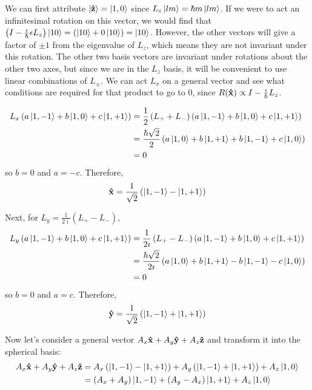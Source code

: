 \documentclass[a4paper,twoside]{article}
\begin{document}
\begin{problem}
    We can first attribute $\ket{\vu{z}} =\ket{1,0} $ since $ L_z\ket{lm} = \hbar m\ket{lm} $. If we were to act an infinitesimal rotation on this vector, we would find that $ \left( I - \frac{\imath}{\hbar} \epsilon L_z \right)\ket{10} = \left(\ket{10} + 0\ket{10} \right) =\ket{10} $. However, the other vectors will give a factor of $ \pm 1 $ from the eigenvalue of $ L_z $, which means they are not invariant under this rotation. The other two basis vectors are invariant under rotations about the other two axes, but since we are in the $ L_z $ basis, it will be convenient to use linear combinations of $ L_{\pm} $. We can act $ L_x $ on a general vector and see what conditions are required for that product to go to $ 0 $, since $ R(\vu{x}) \propto I - \frac{\imath}{\hbar} L_z $.
    
    \begin{align}
        L_x \left( a\ket{1,-1} + b\ket{1,0} + c\ket{1,+1} \right) &= \frac{1}{2} \left( L_+ + L_- \right) \left( a\ket{1,-1} + b\ket{1,0} + c\ket{1,+1} \right) \\
        &= \frac{\hbar \sqrt{2}}{2} \left( a \ket{1,0} + b \ket{1,+1} + b\ket{1,-1} + c\ket{1,0} \right) \\
        &= 0
    \end{align}
    so $ b = 0 $ and $ a = -c $. Therefore,
    \begin{equation}
        \vu{x} = \frac{1}{\sqrt{2}} \left(\ket{1,-1} -\ket{1,+1} \right)
    \end{equation}

    Next, for $ L_y = \frac{1}{2 \imath} (L_+ - L_-) $,
    \begin{align}
        L_y \left( a\ket{1,-1} + b\ket{1,0} + c\ket{1,+1} \right) &= \frac{1}{2 \imath} \left( L_+ - L_- \right) \left( a\ket{1,-1} + b\ket{1,0} + c\ket{1,+1} \right) \\
        &= \frac{\hbar \sqrt{2}}{2 \imath} \left( a\ket{1,0} + b\ket{1,+1} - b\ket{1,-1} - c\ket{1,0} \right) \\
        &= 0
    \end{align}
    so $ b = 0 $ and $ a = c $. Therefore,
    \begin{equation}
        \vu{y} = \frac{1}{\sqrt{2}} \left(\ket{1,-1} +\ket{1,+1} \right)
    \end{equation}

    Now let's consider a general vector $ A_x \vu{x} + A_y \vu{y} + A_z \vu{z} $ and transform it into the spherical basis:
    \begin{align}
        A_x \vu{x} + A_y \vu{y} + A_z \vu{z} &= A_x \left(\ket{1,-1} -\ket{1,+1} \right) + A_y \left(\ket{1,-1} +\ket{1,+1} \right) + A_z\ket{1,0} \\
        &= \left( A_x + A_y \right)\ket{1,-1} + \left( A_y - A_x \right)\ket{1,+1} + A_z\ket{1,0}
    \end{align}
\end{problem}
\end{document}

